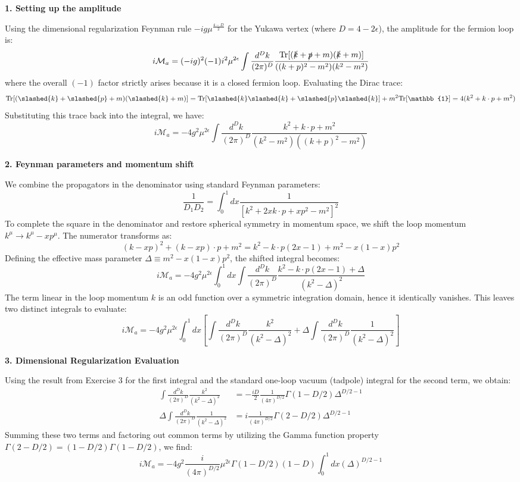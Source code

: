 \textbf{1. Setting up the amplitude}

Using the dimensional regularization Feynman rule $-ig\mu^{\frac{4-D}{2}}$ for the Yukawa vertex (where $D = 4-2\epsilon$), the amplitude for the fermion loop is:
\[
    i\mathcal{M}_a = (-ig)^2 (-1) i^2 \mu^{2\epsilon} \int \frac{d^D k}{(2\pi)^D} \frac{\text{Tr}[(\slashed{k} + \slashed{p} + m)(\slashed{k} + m)]}{((k+p)^2 - m^2)(k^2 - m^2)} \text{}
\]
where the overall $(-1)$ factor strictly arises because it is a closed fermion loop.
Evaluating the Dirac trace:
\[
    \text{Tr}[(\slashed{k} + \slashed{p} + m)(\slashed{k} + m)] = \text{Tr}[\slashed{k}\slashed{k} + \slashed{p}\slashed{k}] + m^2\text{Tr}[\mathbb{1}] = 4(k^2 + k \cdot p + m^2) \text{}
\]
Substituting this trace back into the integral, we have:
\[
    i\mathcal{M}_a = -4g^2 \mu^{2\epsilon} \int \frac{d^D k}{(2\pi)^D} \frac{k^2 + k \cdot p + m^2}{(k^2 - m^2)((k+p)^2 - m^2)} \text{}
\]

\textbf{2. Feynman parameters and momentum shift}

We combine the propagators in the denominator using standard Feynman parameters:
\[
    \frac{1}{D_1 D_2} = \int_0^1 dx \frac{1}{[k^2 + 2x k \cdot p + x p^2 - m^2]^2} \text{}
\]
To complete the square in the denominator and restore spherical symmetry in momentum space, we shift the loop momentum $k^\mu \to k^\mu - x p^\mu$. The numerator transforms as:
\[
    (k - xp)^2 + (k - xp) \cdot p + m^2 = k^2 - k \cdot p(2x - 1) + m^2 - x(1-x)p^2 \text{}
\]
Defining the effective mass parameter $\Delta \equiv m^2 - x(1-x)p^2$, the shifted integral becomes:
\[
    i\mathcal{M}_a = -4g^2 \mu^{2\epsilon} \int_0^1 dx \int \frac{d^D k}{(2\pi)^D} \frac{k^2 - k \cdot p(2x - 1) + \Delta}{(k^2 - \Delta)^2} \text{}
\]
The term linear in the loop momentum $k$ is an odd function over a symmetric integration domain, hence it identically vanishes. This leaves two distinct integrals to evaluate:
\[
    i\mathcal{M}_a = -4g^2 \mu^{2\epsilon} \int_0^1 dx \left[ \int \frac{d^D k}{(2\pi)^D} \frac{k^2}{(k^2 - \Delta)^2} + \Delta \int \frac{d^D k}{(2\pi)^D} \frac{1}{(k^2 - \Delta)^2} \right] \text{}
\]

\textbf{3. Dimensional Regularization Evaluation}

Using the result from Exercise 3 for the first integral and the standard one-loop vacuum (tadpole) integral for the second term, we obtain:
\begin{align*}
    \int \frac{d^D k}{(2\pi)^D} \frac{k^2}{(k^2 - \Delta)^2}      & = -\frac{iD}{2} \frac{1}{(4\pi)^{D/2}} \Gamma(1 - D/2) \Delta^{D/2 - 1} \\
    \Delta \int \frac{d^D k}{(2\pi)^D} \frac{1}{(k^2 - \Delta)^2} & = i \frac{1}{(4\pi)^{D/2}} \Gamma(2 - D/2) \Delta^{D/2 - 1}
\end{align*}
Summing these two terms and factoring out common terms by utilizing the Gamma function property $\Gamma(2 - D/2) = (1 - D/2)\Gamma(1 - D/2)$, we find:
\[
    i\mathcal{M}_a = -4g^2 \frac{i}{(4\pi)^{D/2}} \mu^{2\epsilon} \Gamma(1 - D/2) (1 - D) \int_0^1 dx (\Delta)^{D/2 - 1} \text{}
\]

